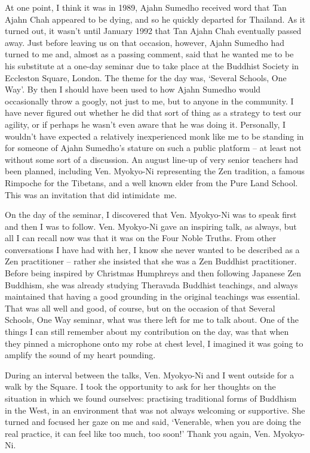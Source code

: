 At one point, I think it was in 1989, Ajahn Sumedho received word that
Tan Ajahn Chah appeared to be dying, and so he quickly departed for
Thailand. As it turned out, it wasn't until January 1992 that Tan Ajahn
Chah eventually passed away. Just before leaving us on that occasion,
however, Ajahn Sumedho had turned to me and, almost as a passing
comment, said that he wanted me to be his substitute at a one-day
seminar due to take place at the Buddhist Society in Eccleston Square,
London. The theme for the day was, `Several Schools, One Way'. By then I
should have been used to how Ajahn Sumedho would occasionally throw a
googly, not just to me, but to anyone in the community. I have never
figured out whether he did that sort of thing as a strategy to test our
agility, or if perhaps he wasn't even aware that he was doing it.
Personally, I wouldn't have expected a relatively inexperienced monk
like me to be standing in for someone of Ajahn Sumedho's stature on such
a public platform -- at least not without some sort of a discussion. An
august line-up of very senior teachers had been planned, including Ven.
Myokyo-Ni representing the Zen tradition, a famous Rimpoche for the
Tibetans, and a well known elder from the Pure Land School. This was an
invitation that did intimidate~me.

On the day of the seminar, I discovered that Ven. Myokyo-Ni was to speak
first and then I was to follow. Ven. Myokyo-Ni gave an inspiring talk,
as always, but all I can recall now was that it was on the Four Noble
Truths. From other conversations I have had with her, I know she never
wanted to be described as a Zen practitioner -- rather she insisted that
she was a Zen Buddhist practitioner. Before being inspired by Christmas
Humphreys and then following Japanese Zen Buddhism, she was already studying
Theravada Buddhist teachings, and always maintained that having a good
grounding in the original teachings was essential. That was all well and
good, of course, but on the occasion of that Several Schools, One Way
seminar, what was there left for me to talk about. One of the things I can still remember about my contribution on the day, was that when they pinned
a microphone onto my robe at chest level, I imagined it was going to
amplify the sound of my heart pounding.

During an interval between the talks, Ven. Myokyo-Ni and I went outside for
a walk by the Square. I took the opportunity to ask for her thoughts on
the situation in which we found ourselves: practising traditional forms
of Buddhism in the West, in an environment that was not always welcoming
or supportive. She turned and focused her gaze on me
and said, `Venerable, when you are doing the real practice, it can
feel like too much, too soon!' Thank you again, Ven. Myokyo-Ni.


